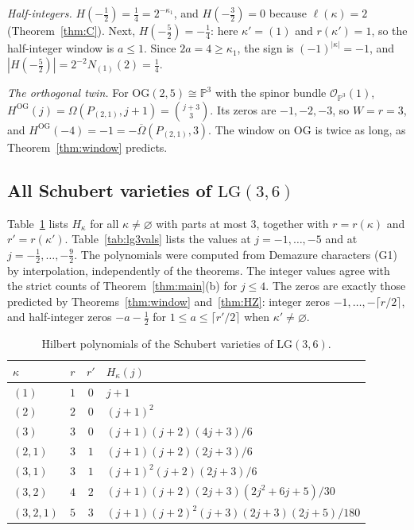 \documentclass[11pt]{amsart}
\theoremstyle{definition}
\theoremstyle{remark}
\newcommand{\LG}{\mathrm{LG}}
\newcommand{\OG}{\mathrm{OG}}
\newcommand{\cO}{\mathcal{O}}
\newcommand{\Om}{\Omega}
\newcommand{\Omb}{\overline{\Omega}}
\newcommand{\HOG}{H^{\OG}}
\begin{document}
\emph{Half-integers.} $H(-\tfrac12)=\tfrac14=2^{-\kappa_1}$, and $H(-\tfrac32)=0$ because
$\ell(\kappa)=2$ (Theorem~\ref{thm:C}). Next, $H(-\tfrac52)=-\tfrac14$: here $\kappa'=(1)$ and
$r(\kappa')=1$, so the half-integer window is $a\le1$. Since $2a=4\ge\kappa_1$, the sign is
$(-1)^{|\kappa|}=-1$, and $|H(-\tfrac52)|=2^{-2}N_{(1)}(2)=\tfrac14$.

\emph{The orthogonal twin.} For $\OG(2,5)\cong\mathbb{P}^3$ with the spinor bundle
$\cO_{\mathbb{P}^3}(1)$, $\HOG(j)=\Om(P_{(2,1)},j+1)=\binom{j+3}{3}$. Its zeros are
$-1,-2,-3$, so $W=r=3$, and $\HOG(-4)=-1=-\Omb(P_{(2,1)},3)$. The window on $\OG$ is twice as
long, as Theorem~\ref{thm:window} predicts.

\subsection{All Schubert varieties of \texorpdfstring{$\LG(3,6)$}{LG(3,6)}}
Table~\ref{tab:lg3} lists $H_\kappa$ for all $\kappa\ne\varnothing$ with parts at most $3$,
together with $r=r(\kappa)$ and $r'=r(\kappa')$. Table~\ref{tab:lg3vals} lists the values at
$j=-1,\dots,-5$ and at $j=-\tfrac12,\dots,-\tfrac92$. The polynomials were computed from
Demazure characters (G1) by interpolation, independently of the theorems. The integer values
agree with the strict counts of Theorem~\ref{thm:main}(b) for $j\le4$. The zeros are exactly
those predicted by Theorems~\ref{thm:window} and~\ref{thm:HZ}: integer zeros $-1,\dots,-\lceil
r/2\rceil$, and half-integer zeros $-a-\tfrac12$ for $1\le a\le\lceil r'/2\rceil$ when
$\kappa'\ne\varnothing$.

\begin{table}[ht]
\centering
\renewcommand{\arraystretch}{1.15}
\begin{tabular}{@{}lccl@{}}
\toprule
$\kappa$ & $r$ & $r'$ & $H_\kappa(j)$\\
\midrule
$(1)$ & $1$ & $0$ & $j+1$\\
$(2)$ & $2$ & $0$ & $(j+1)^2$\\
$(3)$ & $3$ & $0$ & $(j+1)(j+2)(4j+3)/6$\\
$(2,1)$ & $3$ & $1$ & $(j+1)(j+2)(2j+3)/6$\\
$(3,1)$ & $3$ & $1$ & $(j+1)^2(j+2)(2j+3)/6$\\
$(3,2)$ & $4$ & $2$ & $(j+1)(j+2)(2j+3)(2j^2+6j+5)/30$\\
$(3,2,1)$ & $5$ & $3$ & $(j+1)(j+2)^2(j+3)(2j+3)(2j+5)/180$\\
\bottomrule
\end{tabular}
\caption{Hilbert polynomials of the Schubert varieties of $\LG(3,6)$.}\label{tab:lg3}
\end{table}
\end{document}
